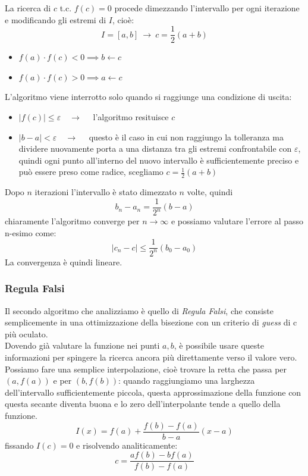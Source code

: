La ricerca di $c$ t.c. $f(c)=0$ procede dimezzando l'intervallo per ogni iterazione e modificando gli estremi di $I$, cioè:
\[
I = [a,b]\ \longrightarrow\ c = \frac{1}{2}(a+b)
\]

\begin{itemize}
    \item $f(a)\cdot f(c) < 0 \implies b \leftarrow{} c$
    \item $f(a)\cdot f(c) > 0 \implies a \leftarrow{} c$
\end{itemize}
L'algoritmo viene interrotto solo quando si raggiunge una condizione di uscita:
\begin{itemize}
    \item $|f(c)| \le \varepsilon \quad \longrightarrow \quad $ l'algoritmo resituisce $c$
    \item $|b-a| < \varepsilon  \quad \longrightarrow \quad $ questo è il caso in cui non raggiungo la tolleranza ma dividere nuovamente porta a una distanza tra gli estremi confrontabile con $\varepsilon$, quindi ogni punto all'interno del nuovo intervallo è sufficientemente preciso e può essere preso come radice, scegliamo $c=\frac{1}{2}(a+b)$
\end{itemize}

\bigskip
\noindent Dopo $n$ iterazioni l'intervallo è stato dimezzato $n$ volte, quindi 
$$b_n - a_n=\frac{1}{2^n}(b-a)$$
chiaramente l'algoritmo converge per $n\to \infty$ e possiamo valutare l'errore al passo n-esimo come:
\[
    |c_n - c |  \leq \frac{1}{2^n} (b_0 - a_0)
\]
La convergenza è quindi lineare.

\subsubsection{Regula Falsi}
Il secondo algoritmo che analizziamo è quello di \textit{Regula Falsi}, che consiste semplicemente in una ottimizzazione della bisezione con un criterio di \textit{guess} di c più oculato.\\
Dovendo già valutare la funzione nei punti $a,b$, è possibile usare queste informazioni per spingere la ricerca ancora più direttamente verso il valore vero. Possiamo fare una semplice interpolazione, cioè trovare la retta che passa per $(a, f(a))$ e per $(b, f(b))$: quando raggiungiamo una larghezza dell'intervallo sufficientemente piccola, questa approssimazione della funzione con questa secante diventa buona e lo zero dell'interpolante tende a quello della funzione. 
$$
    I(x) = f(a) + \frac{f(b)-f(a)}{b-a} (x-a)
$$
fissando $I(c) = 0$ e risolvendo analiticamente:
\[
    c = \frac{a f(b) - b f(a)}{f(b) - f(a)}
\]

